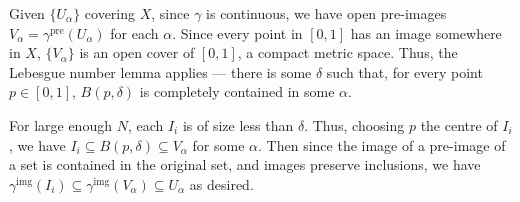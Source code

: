\documentclass[12 pt, letterpaper]{hmcpset}
\begin{document}
\begin{solution}
	Given $\{ U_{\alpha} \}$ covering $X$, since $\gamma$ is continuous, we have open pre-images $V_{\alpha} = \gamma^{\text{pre}}(U_{\alpha})$ for each $\alpha$. Since every point in $[0, 1]$ has an image somewhere in $X$, $\{ V_{\alpha} \}$ is an open cover of $[0, 1]$, a compact metric space. Thus, the Lebesgue number lemma applies --- there is some $\delta$ such that, for every point $p \in [0, 1]$, $B(p, \delta)$ is completely contained in some $\alpha$.

	For large enough $N$, each $I_{i}$ is of size less than $\delta$. Thus, choosing $p$ the centre of $I_{i}$, we have $I_{i} \subseteq B(p, \delta) \subseteq V_{\alpha}$ for some $\alpha$. Then since the image of a pre-image of a set is contained in the original set, and images preserve inclusions, we have $\gamma^{\text{img}}(I_{i}) \subseteq \gamma^{\text{img}}(V_{\alpha}) \subseteq U_{\alpha}$ as desired.
\end{solution}
\end{document}

